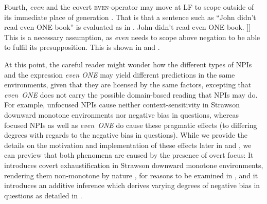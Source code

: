 Fourth, \textit{even} and the covert {\scshape even}-operator may move at LF to scope outside of its immediate place of generation \parencite[see, amongst others,][]{Karttunen1979,Wilkinson1996,Lahiri1998}. That is that a sentence such as \enquote{John didn't read even \MakeUppercase{one} book} is evaluated as in .
\pex[nopreamble=true]\label{ex:even-movement}%
\a{} John didn't read even \MakeUppercase{one} book.
\a[]\phantomsection [even\textsubscript{C} [not \sout{even\textsubscript{C}} [John read one\textsubscript{F} book]]]
\xe
This is a necessary assumption, as \textit{even} needs to scope above negation to be able to fulfil its presupposition. This is shown in  and .

At this point, the careful reader might wonder how the different types of NPIs and the expression \textit{even ONE} may yield different predictions in the same environments, given that they are licensed by the same factors, excepting that \textit{even~ONE} does not carry the possible domain-based reading that NPIs may do. For example, unfocused NPIs cause neither context-sensitivity in Strawson downward monotone environments nor negative bias in questions, whereas focused NPIs as well as \textit{even~ONE} do cause these pragmatic effects (to differing degrees with regards to the negative bias in questions). While we provide the details on the motivation and implementation of these effects later in  and , we can preview that both phenomena are caused by the presence of overt focus: It introduces covert exhaustification in Strawson downward monotone environments, rendering them non-monotone by nature \parencite{Klecha2014,Klecha2015}, for reasons to be examined in , and it introduces an additive inference which derives varying degrees of negative bias in questions \parencite{Jeong2021,Jeong2022} as detailed in .

